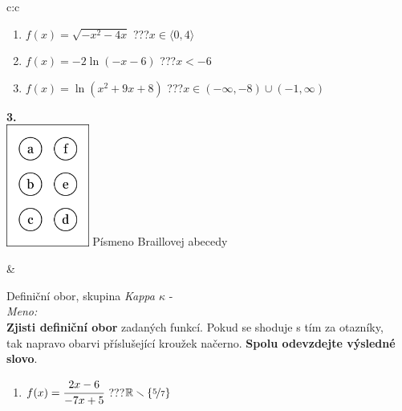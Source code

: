 \documentclass[10pt]{report}
\begin{document}
\begin{tabular}{c:c}
\begin{minipage}[c][99mm][t]{0.49\linewidth}
\begin{center}
\begin{minipage}{0.77\linewidth}
\begin{center}
\begin{varwidth}{\textwidth}
\begin{enumerate}
\item $f(x)=\sqrt{-x^2-4x}$\quad \dotfill\; ???\;\dotfill \quad $x\in\langle0 , 4\rangle$
\item $f(x)=-2\ln{(-x-6)}$\quad \dotfill\; ???\;\dotfill \quad $x<-6$
\item $f(x)=\ln{(x^2+9x+8)}$\quad \dotfill\; ???\;\dotfill \quad $x\in(-\infty , -8)\cup(-1 , \infty)$
\end{enumerate}
\end{varwidth}
\end{center}
\end{minipage}
\begin{minipage}{0.20\linewidth}
\begin{center}
{\Huge\bfseries 3.} \\[2mm]
\includegraphics[height=40mm]{../images/braille.png}
{\small Písmeno Braillovej abecedy}
\end{center}
\end{minipage}
\end{center}
\end{minipage}
&
\begin{minipage}[c][99mm][t]{0.49\linewidth}
\begin{center}
\vspace{7mm}
{\huge Definiční obor, skupina \textit{Kappa $\kappa$} -}\\[4.5mm]
\textit{Meno:}\phantom{xxxxxxxxxxxxxxxxxxxxxxxxxxxxxxxxxxxxxxxxxxxxxxxxxxxxxxxxxxxxxxxxx}\\[3.5mm]
\textbf{Zjisti definiční obor} zadaných funkcí. Pokud se shoduje s tím za otazníky,\\tak napravo obarvi příslušející kroužek načerno. \textbf{Spolu odevzdejte výsledné slovo}.\\[3mm]
\begin{minipage}{0.77\linewidth}
\begin{center}
\begin{varwidth}{\textwidth}
\begin{enumerate}
\normalsize
\item $f(x)=\cfrac{2x-6}{-7x+5}$\quad \dotfill\; ???\;\dotfill \quad $\mathbb{R}\smallsetminus\{\nicefrac{5}{7}\}$

\end{enumerate}
\end{varwidth}
\end{center}
\end{minipage}
\end{center}
\end{minipage}
\end{tabular}
\end{document}
